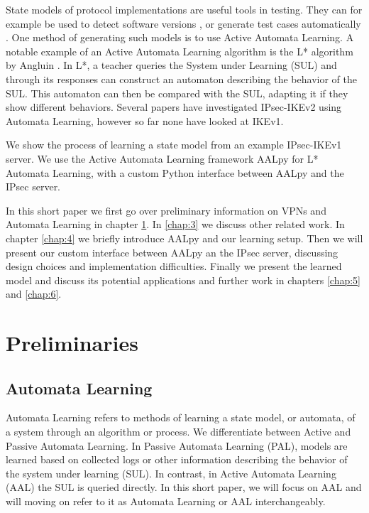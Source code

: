 \documentclass[runningheads]{llncs}
\begin{document}
State models of protocol implementations are useful tools in testing. They can for example be used to detect software versions \cite{pferscher2021fingerprinting}, or generate test cases automatically \cite{pferscher2022fuzzing}. One method of generating such models is to use Active Automata Learning. A notable example of an Active Automata Learning algorithm is the L* algorithm by Angluin \cite{angluin1987learning}. In L*, a teacher queries the System under Learning (SUL) and through its responses can construct an automaton describing the behavior of the SUL. This automaton can then be compared with the SUL, adapting it if they show different behaviors. Several papers have investigated IPsec-IKEv2 using Automata Learning, however so far none have looked at IKEv1. 

We show the process of learning a state model from an example IPsec-IKEv1 server. We use the Active Automata Learning framework AALpy \cite{muvskardin2022aalpy} for L* Automata Learning, with a custom Python interface between AALpy and the IPsec server.

In this short paper we first go over preliminary information on VPNs and Automata Learning in chapter \ref{chap:2}. In \ref{chap:3} we discuss other related work. In chapter \ref{chap:4} we briefly introduce AALpy and our learning setup. Then we will present our custom interface between AALpy an the IPsec server, discussing design choices and implementation difficulties. Finally we present the learned model and discuss its potential applications and further work in chapters \ref{chap:5} and \ref{chap:6}.



\section{Preliminaries} \label{chap:2} %
\subsection{Automata Learning}
Automata Learning refers to methods of learning a state model, or automata, of a system through an algorithm or process. We differentiate between Active and Passive Automata Learning. In Passive Automata Learning (PAL), models are learned based on collected logs or other information describing the behavior of the system under learning (SUL). In contrast, in Active Automata Learning (AAL) the SUL is queried directly. In this short paper, we will focus on AAL and will moving on refer to it as Automata Learning or AAL interchangeably. 
\end{document}
